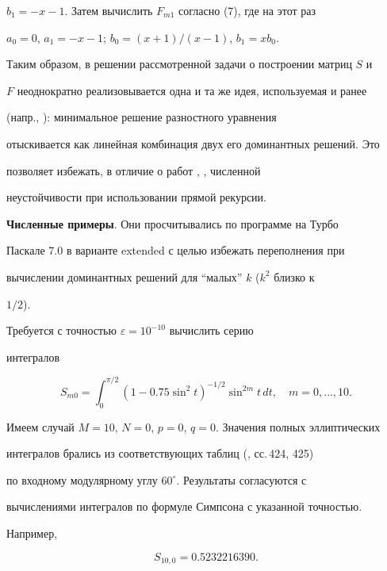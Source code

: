 $b_1=-x-1$. Затем вычислить $F_{m1}$ согласно (7), где на этот раз 


$a_0=0$, $a_1=-x-1$; $b_0=(x+1)/(x-1)$, $b_1=x b_0$. 


 


Таким образом, в решении рассмотренной задачи о построении матриц $S$ и 


$F$ неоднократно реализовывается одна и та же идея, используемая и ранее 


(напр., \cite{9}): минимальное решение разностного уравнения 


отыскивается как линейная комбинация двух его доминантных решений. Это 


позволяет избежать, в отличие о работ \cite{2}, \cite{10}, численной 


неустойчивости при использовании прямой рекурсии. 


\medskip 


 


{\bf Численные примеры}. Они просчитывались по программе на Турбо 


Паскале 7.0 в варианте extended с целью избежать переполнения при 


вычислении доминантных решений для ``малых'' $k$ ($k^2$ близко к 


$1/2$). 


 


\begin{exam} 


Требуется с точностью $\varepsilon=10^{-10}$ вычислить серию 


интегралов 


$$ 


S_{m0}=\int^{\pi/2}_0(1-0.75\sin^2t)^{-1/2}\sin^{2m}t\,dt,\quad 


m=0,\dotsc,10. 


$$ 


 


Имеем случай $M=10$, $N=0$, $p=0$, $q=0$. Значения полных эллиптических 


интегралов брались из соответствующих таблиц (\cite{5}, сс.\,424, 425) 


по входному модулярному углу $60^\circ$. Результаты согласуются с 


вычислениями интегралов по формуле Симпсона с указанной точностью. 


Например, 


$$ 


S_{10,0}=0.5232216390. 


$$ 


\end{exam} 


